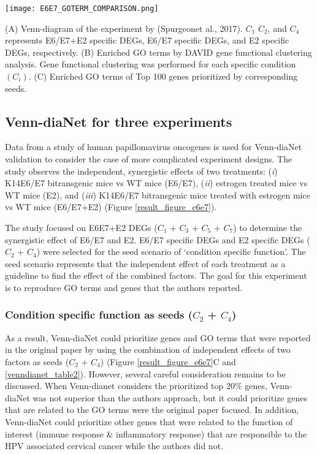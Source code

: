 \documentclass[oneside,phd]{snuthesis}
\begin{document}
\begin{figure*}
\begin{center}
\texttt{[image: E6E7\_GOTERM\_COMPARISON.png]}
\end{center}
\caption{Venn-diaNet HPV experiment GO term Comparison}
\scriptsize{(A) Venn-diagram of the experiment by (Spurgeonet al., 2017).
$C_1$ $C_2$, and $C_4$ represents E6/E7+E2 specific DEGs, E6/E7 specific DEGs, and E2 specific DEGs, respectively.
(B) Enriched GO terms by DAVID gene functional clustering analysis. Gene functional clustering was performed for each specific condition $(C_i)$.
(C) Enriched GO terms of Top 100 genes prioritized by corresponding seeds.}
\label{result_figure_e6e7}
\end{figure*}


\subsection{Venn-diaNet for three experiments}
Data from a study of human papillomavirus oncogenes \citep{spurgeon2017human} is used for Venn-diaNet validation to consider the case of more complicated experiment designs.
The study observes the independent, synergistic effects of two treatments: (\textit{i}) K14E6/E7 bitransgenic mice vs WT mice (E6/E7), (\textit{ii}) estrogen treated mice vs WT mice (E2), and (\textit{iii}) K14E6/E7 bitransgenic mice treated with estrogen mice vs WT mice (E6/E7+E2) (Figure \ref{result_figure_e6e7}).

The study focused on E6E7+E2 DEGs ($C_1$ + $C_3$ + $C_5$ + $C_7$) to determine the synergistic effect of E6/E7 and E2.
E6/E7 specific DEGs and E2 specific DEGs ($C_2$ + $C_4$) were selected for the seed scenario of `condition specific function'.
The seed scenario represents that the independent effect of each treatment as a guideline to find the effect of the combined factors.
The goal for this experiment is to reproduce GO terms and genes that the authors reported. 

\subsubsection{Condition specific function as seeds ($C_2$ + $C_4$)} 
As a result, Venn-diaNet could prioritize genes and GO terms that were reported in the original paper by using the combination of independent effects of two factors as seeds ($C_2$ + $C_4$) (Figure \ref{result_figure_e6e7}C and \ref{venndianet_table2}). 
However, several careful consideration remains to be discussed. 
When Venn-dianet considers the prioritized top 20\% genes, Venn-diaNet was not superior than the authors approach, but it could prioritize genes that are related to the GO terms were the original paper focused. 
In addition, Venn-diaNet could prioritize other genes that were related to the function of interest (immune response \& inflammatory response) that are responsible to the HPV associated cervical cancer while the authors did not.
\end{document}
